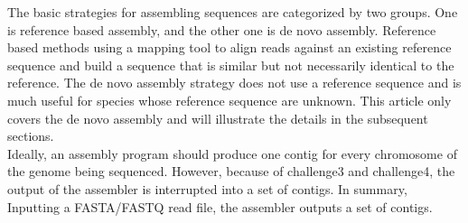 \documentclass{article}
\begin{document}
\noindent The basic strategies for assembling sequences are categorized by two groups. One is reference based assembly, and the other one is de novo assembly. Reference based methods using a mapping tool to align reads against an existing reference sequence and build a sequence that is similar but not necessarily identical to the reference. The de novo assembly strategy does not use a reference sequence and is much useful for species whose reference sequence are unknown. This article only covers the de novo assembly and will illustrate the details in the subsequent sections.\\
Ideally, an assembly program should produce one contig for every chromosome of the genome being sequenced. However, because of challenge3 and challenge4, the output of the assembler is interrupted into a set of contigs. In summary, Inputting a FASTA/FASTQ read file, the assembler outputs a set of contigs.
\end{document}
